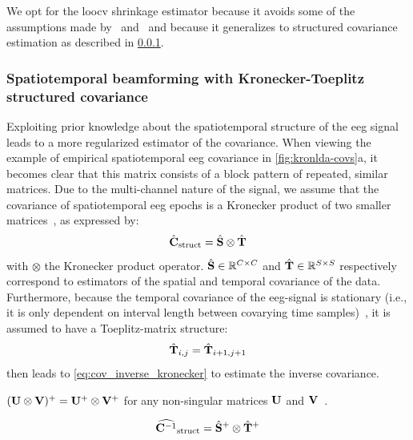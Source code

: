 	We opt for the \ac{loocv} shrinkage estimator because it avoids some of the
	assumptions made by~\cite{Ledoit2004} and~\cite{Chen2010} and
	because it generalizes to structured covariance estimation as described in
	\cref{seq:structured_estimation}.

	\subsubsection{Spatiotemporal beamforming with Kronecker-Toeplitz structured covariance}
	\label{seq:structured_estimation}
	Exploiting prior knowledge about the spatiotemporal structure of the \ac{eeg} signal leads to a more regularized estimator of the covariance.
	When viewing the example of empirical spatiotemporal \ac{eeg} covariance in
	\cref{fig:kronlda-covs}a, it becomes clear that this matrix consists of a block pattern of repeated, similar matrices.
	Due to the multi-channel nature of the signal, we assume that the covariance of spatiotemporal \ac{eeg} epochs is a Kronecker
	product of two smaller
	matrices~\cite{Munck1992,DeMunck1999,Huizenga2002}, as expressed
	by:
	\begin{equation}
    \hat{\mathbf{C}}_\text{struct} = \hat{\mathbf{S}} \otimes \hat{\mathbf{T}}
		\label{eq:kronecker}
	\end{equation}
	with $\otimes$ the Kronecker product operator.
  $\hat{\mathbf{S}} \in \mathbb{R}^{C\times C}$ and $\hat{\mathbf{T}} \in \mathbb{R}^{S\times S}$ respectively correspond to estimators of the spatial and temporal covariance of the data.
	Furthermore, because the temporal covariance of the \ac{eeg}-signal is
	stationary (i.e., it is only dependent on interval length between covarying
	time samples)~\cite{Bijma2003}, it is assumed to have a Toeplitz-matrix structure:
	\begin{equation}
    \hat{\mathbf{T}}_{i,j} = \hat{\mathbf{T}}_{i+1,j+1}
		\label{eq:toeplitz}
	\end{equation}
	 then leads to
	\cref{eq:cov_inverse_kronecker} to estimate the inverse
	covariance.

	\begin{property}
    $(\mathbf{U} \otimes \mathbf{V})^+ = \mathbf{U}^+ \otimes \mathbf{V}^+$ for any non-singular
    matrices $\mathbf{U}$ and $\mathbf{V}$~\cite{Langville2004}.
		\label{prop:inverse_kronecker}
	\end{property}

	\begin{equation}
    \widehat{\mathbf{C}^{-1}}_\text{struct} = \hat{\mathbf{S}}^+ \otimes \hat{\mathbf{T}}^+
		\label{eq:cov_inverse_kronecker}
	\end{equation}

